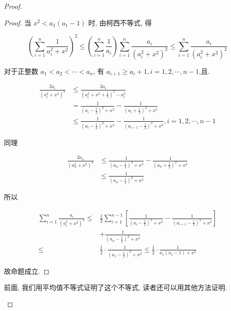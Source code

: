 \begin{proof}
\begin{proof}
	当 $x^{2}<a_{1}\left(a_{1}-1\right)$ 时, 由柯西不等式, 得
	
	$$
	\left(\sum_{i=1}^{n} \frac{1}{a_{i}^{2}+x^{2}}\right)^{2} \leqslant\left(\sum_{i=1}^{n} \frac{1}{a_{i}}\right) \sum_{i=1}^{n} \frac{a_{i}}{\left(a_{i}^{2}+x^{2}\right)^{2}} \leqslant \sum_{i=1}^{n} \frac{a_{i}}{\left(a_{i}^{2}+x^{2}\right)^{2}}
	$$
	
	对于正整数 $a_{1}<a_{2}<\cdots<a_{n}$, 有 $a_{i+1} \geqslant a_{i}+1, i=1,2, \cdots, n-1$,且.
	
	$$
	\begin{aligned}
	\frac{2 a_{i}}{\left(a_{i}^{2}+x^{2}\right)^{2}} & \leqslant \frac{2 a_{i}}{\left(a_{i}^{2}+x^{2}+\frac{1}{4}\right)^{2}-a_{i}^{2}} \\
	& =\frac{1}{\left(a_{i}-\frac{1}{2}\right)^{2}+x^{2}}-\frac{1}{\left(a_{i}+\frac{1}{2}\right)^{2}+x^{2}} \\
	& \leqslant \frac{1}{\left(a_{i}-\frac{1}{2}\right)^{2}+x^{2}}-\frac{1}{\left(a_{i+1}-\frac{1}{2}\right)^{2}+x^{2}}, i=1,2, \cdots, n-1
	\end{aligned}
	$$
	
	同理
	
	$$
	\begin{aligned}
	\frac{2 a_{n}}{\left(a_{n}^{2}+x^{2}\right)^{2}} & \leqslant \frac{1}{\left(a_{n}-\frac{1}{2}\right)^{2}+x^{2}}-\frac{1}{\left(a_{n}+\frac{1}{2}\right)^{2}+x^{2}} \\
	& \leqslant \frac{1}{\left(a_{n}-\frac{1}{2}\right)^{2}+x^{2}}
	\end{aligned}
	$$
	
	所以
	
	$$
	\begin{aligned}
	\sum_{i=1}^{n} \frac{a_{i}}{\left(a_{i}^{2}+x^{2}\right)^{2}} \leqslant & \frac{1}{2} \sum_{i=1}^{n-1}\left[\frac{1}{\left(a_{i}-\frac{1}{2}\right)^{2}+x^{2}}-\frac{1}{\left(a_{i+1}-\frac{1}{2}\right)^{2}+x^{2}}\right] \\
	& +\frac{1}{\left(a_{n}-\frac{1}{2}\right)^{2}+x^{2}} \\
	\leqslant & \frac{1}{2} \cdot \frac{1}{\left(a_{1}-\frac{1}{2}\right)^{2}+x^{2}} \leqslant \frac{1}{2} \cdot \frac{1}{a_{1}\left(a_{1}-1\right)+x^{2}}
	\end{aligned}
	$$
	
	故命题成立.
\end{proof}
\begin{note}
	前面, 我们用平均值不等式证明了这个不等式, 读者还可以用其他方法证明.
\end{note}


\end{proof}
